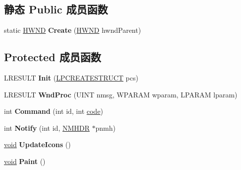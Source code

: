 \subsection*{静态 Public 成员函数}
\begin{DoxyCompactItemize}
\item 
\mbox{\label{struct_notify_area_abd81a405cf814b14e6911650e39b1a91}} 
static \hyperlink{interfacevoid}{H\+W\+ND} {\bfseries Create} (\hyperlink{interfacevoid}{H\+W\+ND} hwnd\+Parent)
\end{DoxyCompactItemize}
\subsection*{Protected 成员函数}
\begin{DoxyCompactItemize}
\item 
\mbox{\label{struct_notify_area_aac1d102af904fad8ef58f47be230de58}} 
L\+R\+E\+S\+U\+LT {\bfseries Init} (\hyperlink{structtag_c_r_e_a_t_e_s_t_r_u_c_t_a}{L\+P\+C\+R\+E\+A\+T\+E\+S\+T\+R\+U\+CT} pcs)
\item 
\mbox{\label{struct_notify_area_aaf7beeb15d654991adaedd205bcad15f}} 
L\+R\+E\+S\+U\+LT {\bfseries Wnd\+Proc} (U\+I\+NT nmsg, W\+P\+A\+R\+AM wparam, L\+P\+A\+R\+AM lparam)
\item 
\mbox{\label{struct_notify_area_aee64f7514400b256f78576067eca7d43}} 
int {\bfseries Command} (int id, int \hyperlink{structcode}{code})
\item 
\mbox{\label{struct_notify_area_a742f5964ccd82324853d715a599f017a}} 
int {\bfseries Notify} (int id, \hyperlink{structtag_n_m_h_d_r}{N\+M\+H\+DR} $\ast$pnmh)
\item 
\mbox{\label{struct_notify_area_a751fe5a3490aa6909dc88f81ec1916cf}} 
\hyperlink{interfacevoid}{void} {\bfseries Update\+Icons} ()
\item 
\mbox{\label{struct_notify_area_aaf2820d5bddd91242ef73ba8f852f7aa}} 
\hyperlink{interfacevoid}{void} {\bfseries Paint} ()
\item 
\mbox{\label{struct_notify_area_a4d0aad8c5b73a5a4437158c116738bab}} 

\end{DoxyCompactItemize}
